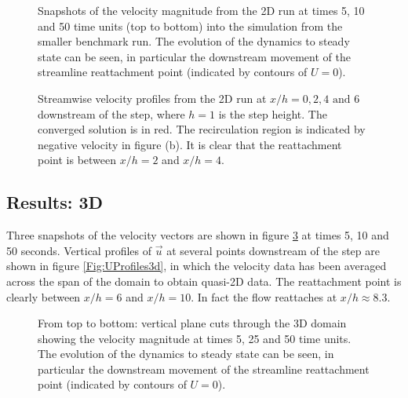 \begin{figure}
\centering
{}
\caption{Snapshots of the velocity magnitude from the 2D run at times 5, 10 and 50 time units
(top to bottom) into the simulation from the smaller benchmark run.
The evolution of the dynamics to steady state can be seen, in particular the downstream movement
of the streamline reattachment point (indicated by contours of $U=0$).}
\label{Fig:velo-magnitude-2d}
\end{figure}

\begin{figure}
\centering
{}
\caption{Streamwise velocity profiles from the 2D run at $x/h=0, 2, 4 \text{ and } 6$
downstream of the step, where $h=1$ is the step height. The converged solution is in red.
The recirculation region is indicated by negative velocity in figure (b).
It is clear that the reattachment point is between $x/h=2$ and $x/h=4$.}
\label{Fig:UProfiles2d}
\end{figure}


\subsection{Results: 3D}
Three snapshots of the velocity vectors are shown in figure \ref{Fig:velo-magnitude-3d}
at times 5, 10 and 50 seconds.
Vertical profiles of $\vec{u}$ at several points downstream of the step are shown in figure
\ref{Fig:UProfiles3d}, in which the velocity data has been averaged across the span of the domain
to obtain quasi-2D data. The reattachment point is clearly between $x/h=6$ and $x/h=10$.
In fact the flow reattaches at $x/h \approx 8.3$.


\begin{figure}
\centering
{}
\caption{From top to bottom: vertical plane cuts through the 3D domain showing
the velocity magnitude at times 5, 25 and 50 time units.
The evolution of the dynamics to steady state can be seen, in particular the downstream movement
of the streamline reattachment point (indicated by contours of $U=0$).}
\label{Fig:velo-magnitude-3d}
\end{figure}

